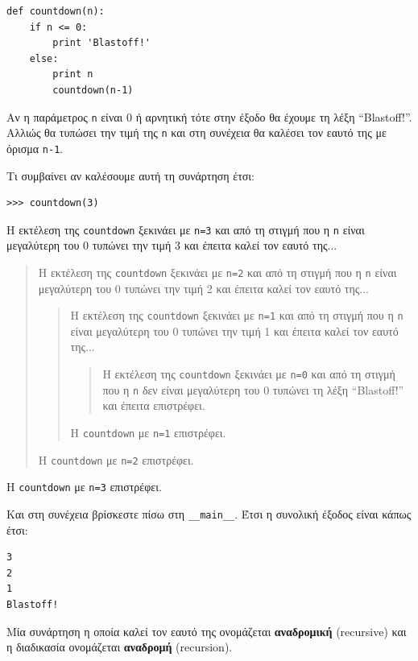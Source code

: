 \documentclass[10pt]{book}
\begin{document}
\begin{verbatim}
def countdown(n):
    if n <= 0:
        print 'Blastoff!'
    else:
        print n
        countdown(n-1)
\end{verbatim}
%

Αν η παράμετρος {\tt n} είναι 0 ή αρνητική τότε στην έξοδο θα έχουμε τη λέξη ``Blastoff!''. Αλλιώς θα τυπώσει την τιμή της {\tt n} και στη συνέχεια θα καλέσει τον εαυτό της με όρισμα {\tt n-1}.

Τι συμβαίνει αν καλέσουμε αυτή τη συνάρτηση έτσι:

\begin{verbatim}
>>> countdown(3)
\end{verbatim}
%

Η εκτέλεση της {\tt countdown} ξεκινάει με {\tt n=3}  και από τη στιγμή
που η {\tt n} είναι μεγαλύτερη του 0 τυπώνει την τιμή 3 και έπειτα καλεί τον εαυτό της...

\begin{quote}
Η εκτέλεση της {\tt countdown} ξεκινάει με {\tt n=2} και από τη στιγμή που η
{\tt n} είναι μεγαλύτερη του 0 τυπώνει την τιμή 2 και έπειτα καλεί τον εαυτό της...

\begin{quote}
Η εκτέλεση της {\tt countdown} ξεκινάει με {\tt n=1} και από τη στιγμή που η
{\tt n} είναι μεγαλύτερη του 0 τυπώνει την τιμή 1 και έπειτα καλεί τον εαυτό της...

\begin{quote}
Η εκτέλεση της {\tt countdown} ξεκινάει με {\tt n=0} και από τη στιγμή που η
{\tt n} δεν είναι μεγαλύτερη του 0 τυπώνει τη λέξη ``Blastoff!'' και έπειτα επιστρέφει.
\end{quote}

Η {\tt countdown} με {\tt n=1} επιστρέφει.
\end{quote}

Η {\tt countdown} με {\tt n=2} επιστρέφει.
\end{quote}

Η {\tt countdown} με {\tt n=3} επιστρέφει.

Και στη συνέχεια βρίσκεστε πίσω στη \verb"__main__".  Έτσι η συνολική έξοδος
είναι κάπως έτσι:

\begin{verbatim}
3
2
1
Blastoff!
\end{verbatim}
%

Μία συνάρτηση η οποία καλεί τον εαυτό της ονομάζεται {\bf αναδρομική} (recursive) και η διαδικασία ονομάζεται {\bf αναδρομή} (recursion).
\end{document}
